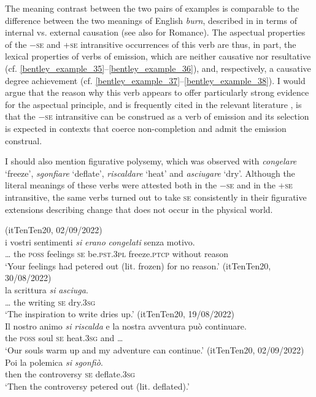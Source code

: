 \documentclass[output=paper,colorlinks,citecolor=brown
]{langscibook}
\begin{document}
The meaning contrast between the two pairs of examples is comparable to the difference between the two meanings of English \textit{burn}, described in \citet[101]{levin1995unaccusativity} in terms of internal vs. external causation (see also \cite{bentley2023internally} for Romance). The aspectual properties of the −\textsc{se} and +\textsc{se} intransitive occurrences of this verb are thus, in part, the lexical properties of verbs of emission, which are neither causative nor resultative (cf. \ref{bentley_example_35}--\ref{bentley_example_36}), and, respectively, a causative degree achievement (cf. \ref{bentley_example_37}--\ref{bentley_example_38}). I would argue that the reason why this verb appears to offer particularly strong evidence for the aspectual principle, and is frequently cited in the relevant literature \citep{jezek2003classi,folli2005consuming,cennamo2011anticausative,cennamo2012aspectual}, is that the −\textsc{se} intransitive can be construed as a verb of emission and its selection is expected in contexts that coerce non-completion and admit the emission construal.

I should also mention figurative polysemy, which was observed with \textit{congelare} ‘freeze’, \textit{sgonfiare} ‘deflate’, \textit{riscaldare} ‘heat’ and \textit{asciugare} ‘dry’. Although the literal meanings of these verbs were attested both in the −\textsc{se} and in the +\textsc{se} intransitive, the same verbs turned out to take \textsc{se} consistently in their figurative extensions describing change that does not occur in the physical world.

\ea \label{bentley_example_39}(itTenTen20, 02/09/2022)\\
    \gll  {\ldots}  i			vostri		sentimenti		\textit{si}		\textit{erano} 					\textit{congelati}			senza			motivo.  \\
    	{\ldots} 	the	\textsc{poss}			feelings			\textsc{se}		be.\textsc{pst}.3\textsc{pl}		freeze.\textsc{ptcp}		without	reason \\
    \glt 	‘Your feelings had petered out (lit. frozen) for no reason.’	
\ex \label{bentley_example_40}(itTenTen20, 30/08/2022)\\
    \gll  {\ldots}  la		scrittura		\textit{si}		\textit{asciuga}.  \\
    	{\ldots} the	writing		\textsc{se}		dry.3\textsc{sg} \\
    \glt ‘The inspiration to write dries up.’
\ex \label{bentley_example_41}(itTenTen20, 19/08/2022)\\
    \gll Il		nostro	animo	\textit{si}		\textit{riscalda} e  {la nostra avventura può continuare. } \\
    	the	\textsc{poss}			soul		\textsc{se}		heat.3\textsc{sg}	and			{\ldots} \\
    \glt 					‘Our souls warm up and my adventure can continue.’
\ex \label{bentley_example_42}(itTenTen20, 02/09/2022)\\
    \gll Poi 	la		polemica				\textit{si}		\textit{sgonfiò}. \\
    			then	the	controversy	\textsc{se}		deflate.3\textsc{sg}	 \\
    \glt ‘Then the controversy petered out (lit. deflated).’
\z
\end{document}
